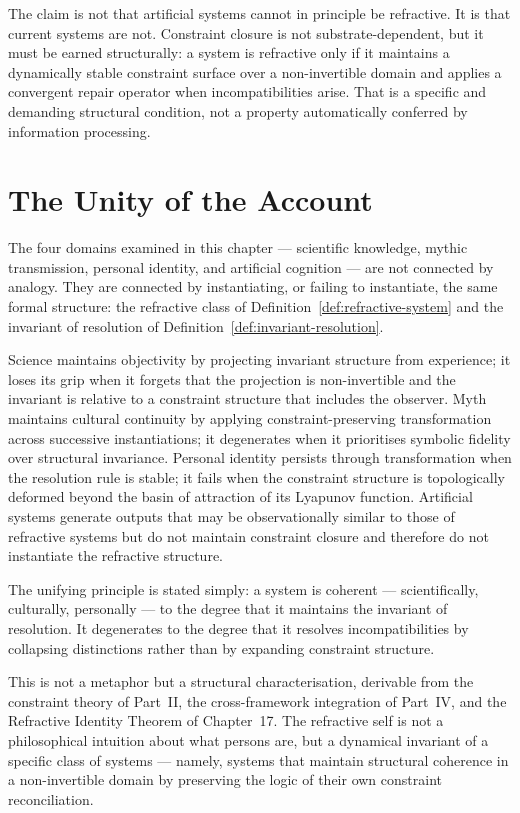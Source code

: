 \documentclass[11pt,openany]{book}
\begin{document}
The claim is not that artificial systems cannot in
principle be refractive.  It is that current systems are
not.  Constraint closure is not substrate-dependent, but it
must be earned structurally: a system is refractive only if
it maintains a dynamically stable constraint surface over a
non-invertible domain and applies a convergent repair
operator when incompatibilities arise.  That is a specific
and demanding structural condition, not a property
automatically conferred by information processing.

\section{The Unity of the Account}
\label{sec:unity}

The four domains examined in this chapter --- scientific
knowledge, mythic transmission, personal identity, and
artificial cognition --- are not connected by analogy.
They are connected by instantiating, or failing to
instantiate, the same formal structure: the refractive
class of Definition~\ref{def:refractive-system} and the
invariant of resolution of
Definition~\ref{def:invariant-resolution}.

Science maintains objectivity by projecting invariant
structure from experience; it loses its grip when it
forgets that the projection is non-invertible and the
invariant is relative to a constraint structure that
includes the observer.  Myth maintains cultural continuity
by applying constraint-preserving transformation across
successive instantiations; it degenerates when it
prioritises symbolic fidelity over structural invariance.
Personal identity persists through transformation when the
resolution rule is stable; it fails when the constraint
structure is topologically deformed beyond the basin of
attraction of its Lyapunov function.  Artificial systems
generate outputs that may be observationally similar to
those of refractive systems but do not maintain constraint
closure and therefore do not instantiate the refractive
structure.

The unifying principle is stated simply: a system is
coherent --- scientifically, culturally, personally --- to
the degree that it maintains the invariant of resolution.
It degenerates to the degree that it resolves
incompatibilities by collapsing distinctions rather than by
expanding constraint structure.

This is not a metaphor but a structural characterisation,
derivable from the constraint theory of Part~II, the
cross-framework integration of Part~IV, and the Refractive
Identity Theorem of Chapter~17.  The refractive self is not
a philosophical intuition about what persons are, but a
dynamical invariant of a specific class of systems ---
namely, systems that maintain structural coherence in a
non-invertible domain by preserving the logic of their own
constraint reconciliation.
\end{document}
